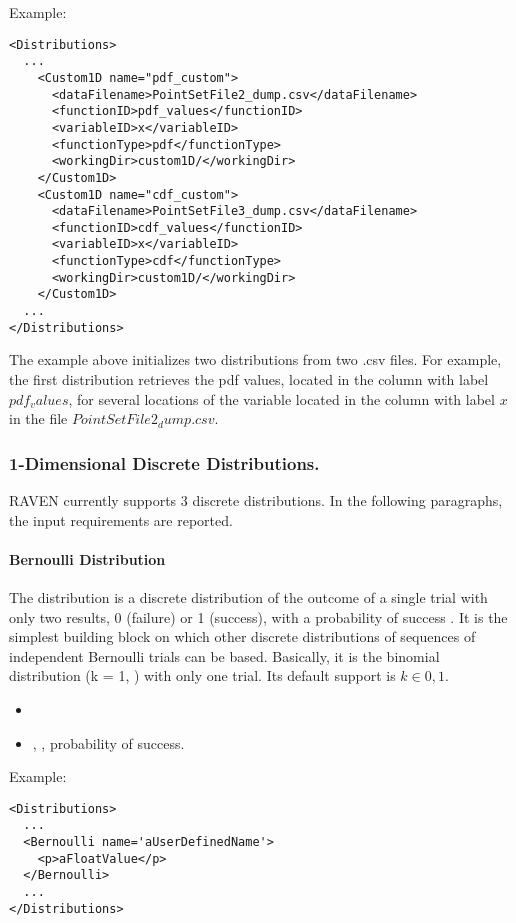 Example:
\begin{lstlisting}[style=XML]
<Distributions>
  ...
    <Custom1D name="pdf_custom">
      <dataFilename>PointSetFile2_dump.csv</dataFilename>
      <functionID>pdf_values</functionID>
      <variableID>x</variableID>
      <functionType>pdf</functionType>
      <workingDir>custom1D/</workingDir>
    </Custom1D>
    <Custom1D name="cdf_custom">
      <dataFilename>PointSetFile3_dump.csv</dataFilename>
      <functionID>cdf_values</functionID>
      <variableID>x</variableID>
      <functionType>cdf</functionType>
      <workingDir>custom1D/</workingDir>
    </Custom1D>
  ...
</Distributions>
\end{lstlisting}


The example above initializes two distributions from two .csv files.
For example, the first distribution retrieves the pdf values, located in the column with label $pdf_values$, for several locations of the variable located in the column
with label $x$ in the file $PointSetFile2_dump.csv$.


\subsubsection{1-Dimensional Discrete Distributions.}
\label{subsubsec:1DDiscrete}
RAVEN currently supports 3 discrete distributions.
%
In the following paragraphs, the input requirements are reported.

\paragraph{Bernoulli Distribution}
\label{Bernoulli}
The  distribution is a discrete distribution of the outcome
of a single trial with only two results, 0 (failure) or 1 (success), with a
probability of success .
%
It is the simplest building block on which other discrete distributions of
sequences of independent Bernoulli trials can be based.
%
Basically, it is the binomial distribution (k = 1, ) with only
one trial.
%
Its default support is $k \in {0, 1}$.

%
\attrIntro
\vspace{-5mm}
\begin{itemize}
  \itemsep0em
  \item \nameDescription
\end{itemize}
\vspace{-5mm}
\subnodeIntro
\begin{itemize}
  \item {}, , probability of
  success.
 \end{itemize}
Example:
\begin{lstlisting}[style=XML]
<Distributions>
  ...
  <Bernoulli name='aUserDefinedName'>
    <p>aFloatValue</p>
  </Bernoulli>
  ...
</Distributions>
\end{lstlisting}

